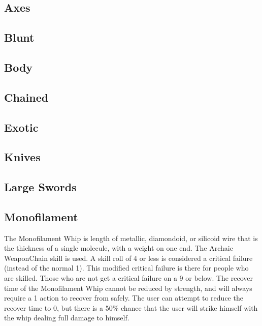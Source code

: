 \documentclass[twoside]{book}
\begin{document}
    

\subsection{Axes}
    
    

\subsection{Blunt}
    
    

\subsection{Body}
    
    

\subsection{Chained}
    
    

\subsection{Exotic}
    
    

\subsection{Knives}
    
    

\subsection{Large Swords}
    
    

\subsection{Monofilament}
      The Monofilament Whip is length of metallic,
               diamondoid, or silicoid wire that is the thickness of a
               single molecule, with a weight on one end. The Archaic
               WeaponChain skill is used. A skill roll of 4 or
               less is considered a critical failure (instead of the
               normal 1). This modified critical failure is there for
               people who are skilled. Those who are not get a critical
               failure on a 9 or below.   The recover time of the Monofilament Whip cannot be
               reduced by strength, and will always require a 1 action to
               recover from safely. The user can attempt to reduce the
               recover time to 0, but there is a 50\% chance that the user
               will strike himself with the whip dealing full damage to
               himself. 
    
\end{document}
